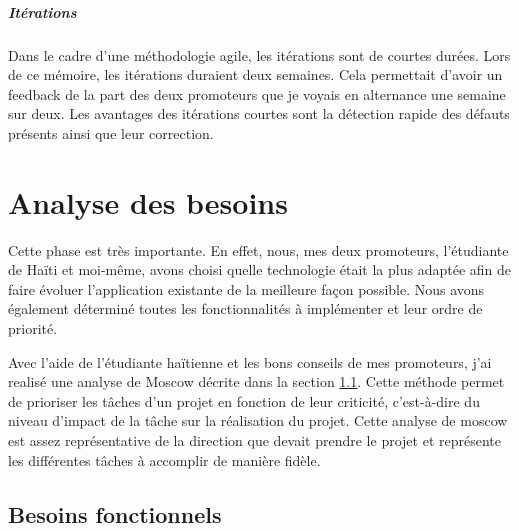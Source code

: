 \documentclass{EPL-master-thesis-covers-FR}
\begin{document}
				\paragraph*{Itérations} Dans le cadre d'une méthodologie agile, les itérations sont de courtes durées. Lors de ce mémoire, les itérations duraient deux semaines. Cela permettait d'avoir un feedback de la part des deux promoteurs que je voyais en alternance une semaine sur deux. Les avantages des itérations courtes sont la détection rapide des défauts présents ainsi que leur correction. 
			
			

	\chapter{Analyse des besoins}
		\label{sec:analyse_besoins}
		Cette phase est très importante. En effet, nous, mes deux promoteurs, l'étudiante de Haïti et moi-même, avons choisi quelle technologie était la plus adaptée afin de faire évoluer l'application existante de la meilleure façon possible. Nous avons également déterminé toutes les fonctionnalités à implémenter et leur ordre de priorité.
		
		Avec l'aide de l'étudiante haïtienne et les bons conseils de mes promoteurs, j'ai realisé une analyse de Moscow décrite dans la section \ref{sec:besoins_fonctionnels}. Cette méthode permet de prioriser les tâches d'un projet en fonction de leur criticité, c'est-à-dire du niveau d'impact de la tâche sur la réalisation du projet.
		Cette analyse de \gls{moscow} est assez représentative de la direction que devait prendre le projet et représente les différentes tâches à accomplir de manière fidèle.


		\section{Besoins fonctionnels}
			\label{sec:besoins_fonctionnels}	
				
\end{document}
